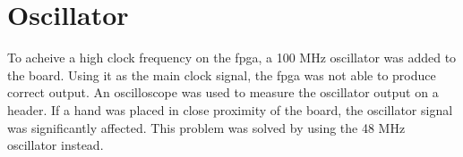 \section{Oscillator}
To acheive a high clock frequency on the \gls{fpga}, a 100 MHz oscillator was added to the board.
Using it as the main clock signal, the \gls{fpga} was not able to produce correct output.
An oscilloscope was used to measure the oscillator output on a header.
If a hand was placed in close proximity of the board, the oscillator signal was significantly affected.
This problem was solved by using the 48 MHz oscillator instead.